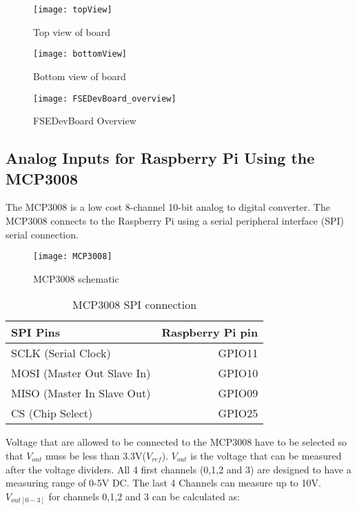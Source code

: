 \documentclass[
10pt, %
a4paper, %
oneside, %
headinclude,footinclude, %
BCOR=5mm, %
table,
]{scrartcl}
\begin{document}
\begin{figure}[h]
  \texttt{[image: topView]}
  \caption{Top view of board}\label{fig:Top view of board}
\endminipage\hfill
{}
  \texttt{[image: bottomView]}
  \caption{Bottom view of board}\label{fig:Bottom view of board}
\endminipage
\end{figure}

\begin{figure}[h]
\centering
\texttt{[image: FSEDevBoard\_overview]}
\caption[FSEDevBoard Overview]{FSEDevBoard Overview}
\label{fig:FSEDevBoard_overview}
\end{figure}

\subsection{Analog Inputs for Raspberry Pi Using the MCP3008}
The MCP3008 is a low cost 8-channel 10-bit analog to digital converter. The MCP3008 connects to the Raspberry Pi using a serial peripheral interface (SPI) serial connection. 

\begin{figure}[h]
\centering
\texttt{[image: MCP3008]} 
\caption[MCP3008 schematic]{MCP3008 schematic}
\label{fig:MCP3008}
\end{figure}

\begin{table}[H]
\centering
\begin{tabular}{lr}
\hline
\textbf{SPI Pins} & \textbf{Raspberry Pi pin} \\
\hline
SCLK (Serial Clock)        & GPIO11 \\
MOSI (Master Out Slave In) & GPIO10 \\
MISO (Master In Slave Out) & GPIO09 \\
CS   (Chip Select)         & GPIO25 \\
\hline
\end{tabular}
\label{tab:label}
\caption{MCP3008 SPI connection}
\end{table}

Voltage that are allowed to be connected to the MCP3008 have to be selected so that \(V_{out}\) muss be less than 3.3V(\(V_{ref}\)). \(V_{out}\) is the voltage that can be measured after the voltage dividers. All 4 first channels (0,1,2 and 3) are designed to have a measuring range of 0-5V DC. The last 4 Channels can measure up to 10V.
\(V_{out[0-3]}\) for channels 0,1,2 and 3 can be calculated as:
\end{document}
